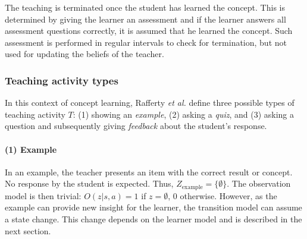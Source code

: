 


The teaching is terminated once the student has learned the concept. This is determined by giving the learner an assessment and if the learner answers all assessment questions correctly, it is assumed that he learned the concept.
Such assessment is performed in regular intervals to check for termination, but not used for updating the beliefs of the teacher.



\subsubsection{Teaching activity types}

In this context of concept learning, Rafferty \textit{et al.} define three possible types of teaching activity  $T$: (1) showing an \textit{example}, (2) asking a \textit{quiz}, and (3) asking a question and subsequently giving \textit{feedback} about the student's response. 


\paragraph{(1) Example} In an example, the teacher presents an item with the correct result or concept. No response by the student is expected. Thus, $Z_{\text{example}} = \{\emptyset\}$. The observation model is then trivial: $O(z|s,a)=1$ if $z=\emptyset$, $0$ otherwise. However, as the example can provide new insight for the learner, the transition model can assume a state change. This change depends on the learner model and is described in the next section.

